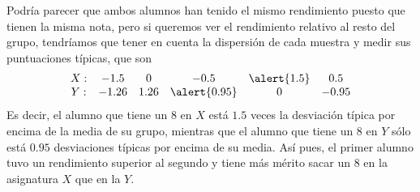 \begin{frame}
{Podría parecer que ambos alumnos han tenido el mismo rendimiento puesto que tienen la misma nota, pero si queremos ver el rendimiento
relativo al resto del grupo, tendríamos que tener en cuenta la dispersión de cada muestra y medir sus puntuaciones típicas, que son
\[
\begin{array}{cccccc}
X: & -1.5 & 0 & -0.5 & \alert{1.5} & 0.5 \\
Y: & -1.26 & 1.26 & \alert{0.95} & 0 & -0.95\\
\end{array}
\]
Es decir, el alumno que tiene un 8 en $X$ está $1.5$ veces la desviación típica por encima de la media de su grupo, mientras que el alumno
que tiene un 8 en $Y$ sólo está $0.95$ desviaciones típicas por encima de su media. Así pues, el primer alumno tuvo un rendimiento superior
al segundo y tiene más mérito sacar un $8$ en la asignatura $X$ que en la $Y$.
}
\end{frame}


